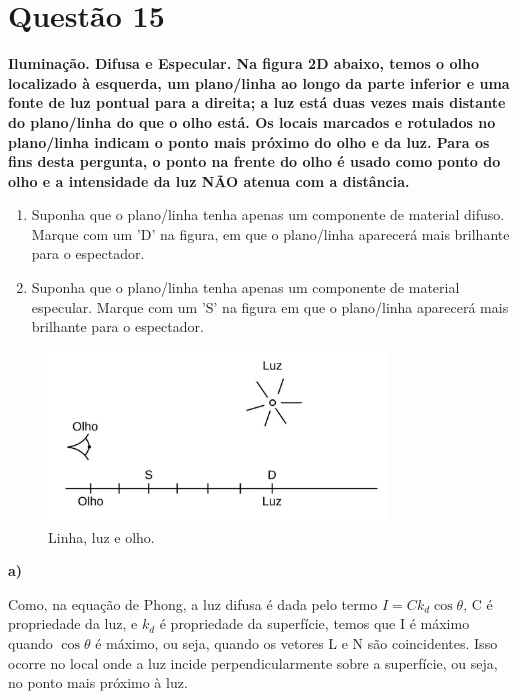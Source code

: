 \documentclass[12pt]{exam}
\begin{document}
\section*{Questão 15}
{\bfseries Iluminação. Difusa e Especular. Na figura 2D abaixo, temos o olho localizado à esquerda, um plano/linha ao longo da parte inferior e uma fonte de luz pontual para a direita; a luz está duas vezes mais distante do plano/linha do que o olho está. Os locais marcados e rotulados no plano/linha indicam o ponto mais próximo do olho e da luz. Para os fins desta pergunta, o ponto na frente do olho é usado como ponto do olho e a intensidade da luz NÃO atenua com a distância.}

\begin{enumerate}[label=\alph*)]
    \item Suponha que o plano/linha tenha apenas um componente de material difuso. Marque com um ’D’ na figura, em que o plano/linha aparecerá mais brilhante para o espectador.
    \item Suponha que o plano/linha tenha apenas um componente de material especular. Marque com um ’S’ na figura em que o plano/linha aparecerá mais brilhante para o espectador.
\end{enumerate}

\begin{figure}[ht]
    \centering
    \includegraphics[width=0.8\textwidth]{images/15.jpg}
    \caption{Linha, luz e olho.}
    \label{fig:15}
\end{figure}

\textbf{a)}

Como, na equação de Phong, a luz difusa é dada pelo termo $I = Ck_d \cos{\theta}$, C é propriedade da luz, e $k_d$ é propriedade da superfície, temos que I é máximo quando $\cos{\theta}$ é máximo, ou seja, quando os vetores L e N são coincidentes. Isso ocorre no local onde a luz incide perpendicularmente sobre a superfície, ou seja, no ponto mais próximo à luz.
\end{document}
